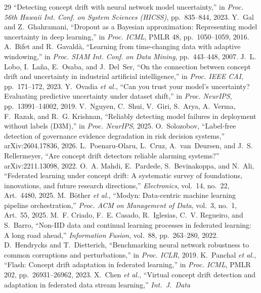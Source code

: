 \documentclass[conference]{IEEEtran}
\begin{document}
\begin{thebibliography}{29}
``Detecting concept drift with neural network model uncertainty,'' in
\emph{Proc. 56th Hawaii Int. Conf. on System Sciences (HICSS)},
pp.~835--844, 2023.
 Y.~Gal and Z.~Ghahramani, ``Dropout as a Bayesian
approximation: Representing model uncertainty in deep learning,'' in
\emph{Proc. ICML}, PMLR 48, pp.~1050--1059, 2016.
 A.~Bifet and R.~Gavald{\`a}, ``Learning from
time-changing data with adaptive windowing,'' in \emph{Proc. SIAM Int.
Conf. on Data Mining}, pp.~443--448, 2007.
 J.~L. Lobo, I.~La{\~n}a, E.~Osaba, and J.~Del~Ser, ``On
the connection between concept drift and uncertainty in industrial
artificial intelligence,'' in \emph{Proc. IEEE CAI}, pp.~171--172, 2023.
 Y.~Ovadia \emph{et al.}, ``Can you trust your model's
uncertainty? Evaluating predictive uncertainty under dataset shift,'' in
\emph{Proc. NeurIPS}, pp.~13991--14002, 2019.
 V.~Nguyen, C.~Shui, V.~Giri, S.~Arya, A.~Verma,
F.~Razak, and R.~G. Krishnan, ``Reliably detecting model failures in
deployment without labels (D3M),'' in \emph{Proc. NeurIPS}, 2025.
 O.~Solozobov, ``Label-free detection of governance
evidence degradation in risk decision systems,'' arXiv:2604.17836, 2026.
 L.~Poenaru-Olaru, L.~Cruz, A.~van~Deursen, and
J.~S. Rellermeyer, ``Are concept drift detectors reliable alarming
systems?'' arXiv:2211.13098, 2022.
 O.~A. Mahdi, E.~Pardede, S.~Bevinakoppa, and N.~Ali,
``Federated learning under concept drift: A systematic survey of
foundations, innovations, and future research directions,''
\emph{Electronics}, vol.~14, no.~22, Art.~4480, 2025.
 M.~B{\"o}ther \emph{et al.}, ``Modyn: Data-centric
machine learning pipeline orchestration,'' \emph{Proc. ACM on Management of
Data}, vol.~3, no.~1, Art.~55, 2025.
 M.~F. Criado, F.~E. Casado, R.~Iglesias, C.~V.
Regueiro, and S.~Barro, ``Non-IID data and continual learning processes in
federated learning: A long road ahead,'' \emph{Information Fusion},
vol.~88, pp.~263--280, 2022.
 D.~Hendrycks and T.~Dietterich, ``Benchmarking
neural network robustness to common corruptions and perturbations,'' in
\emph{Proc. ICLR}, 2019.
 K.~Panchal \emph{et al.}, ``Flash: Concept drift
adaptation in federated learning,'' in \emph{Proc. ICML}, PMLR 202,
pp.~26931--26962, 2023.
 X.~Chen \emph{et al.}, ``Virtual concept drift detection
and adaptation in federated data stream learning,'' \emph{Int.\ J.\ Data
}
\end{thebibliography}
\end{document}
